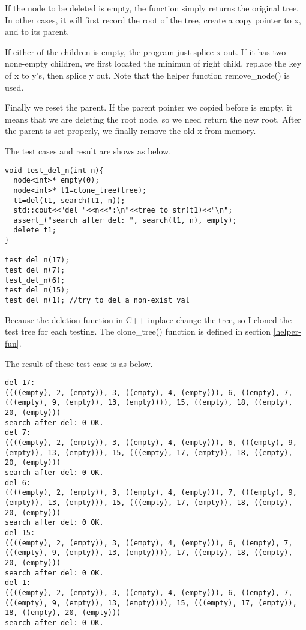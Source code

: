 \documentclass{article}
\begin{document}
If the node to be deleted is empty, the function simply returns the original tree.
In other cases, it will first record the root of the tree, create a copy pointer
to x, and to its parent.

If either of the children is empty, the program just splice x out. If it has two
none-empty children, we first located the minimun of right child, replace the key
of x to y's, then splice y out. Note that the helper function remove\_node() is
used.

Finally we reset the parent. If the parent pointer we copied before is empty, it
means that we are deleting the root node, so we need return the new root. After
the parent is set properly, we finally remove the old x from memory.

The test cases and result are shows as below.

\begin{lstlisting}
void test_del_n(int n){
  node<int>* empty(0);
  node<int>* t1=clone_tree(tree);
  t1=del(t1, search(t1, n));
  std::cout<<"del "<<n<<":\n"<<tree_to_str(t1)<<"\n";
  assert_("search after del: ", search(t1, n), empty);
  delete t1;
}

test_del_n(17);
test_del_n(7);
test_del_n(6);
test_del_n(15);
test_del_n(1); //try to del a non-exist val
\end{lstlisting}

Because the deletion function in C++ inplace change the tree, so I cloned the test 
tree for each testing. The clone\_tree() function is defined in section \ref{helper-fun}.

The result of these test case is as below.
\begin{verbatim}
del 17:
((((empty), 2, (empty)), 3, ((empty), 4, (empty))), 6, ((empty), 7, 
(((empty), 9, (empty)), 13, (empty)))), 15, ((empty), 18, ((empty), 
20, (empty)))
search after del: 0 OK.
del 7:
((((empty), 2, (empty)), 3, ((empty), 4, (empty))), 6, (((empty), 9, 
(empty)), 13, (empty))), 15, (((empty), 17, (empty)), 18, ((empty), 
20, (empty)))
search after del: 0 OK.
del 6:
((((empty), 2, (empty)), 3, ((empty), 4, (empty))), 7, (((empty), 9, 
(empty)), 13, (empty))), 15, (((empty), 17, (empty)), 18, ((empty), 
20, (empty)))
search after del: 0 OK.
del 15:
((((empty), 2, (empty)), 3, ((empty), 4, (empty))), 6, ((empty), 7, 
(((empty), 9, (empty)), 13, (empty)))), 17, ((empty), 18, ((empty), 
20, (empty)))
search after del: 0 OK.
del 1:
((((empty), 2, (empty)), 3, ((empty), 4, (empty))), 6, ((empty), 7, 
(((empty), 9, (empty)), 13, (empty)))), 15, (((empty), 17, (empty)), 
18, ((empty), 20, (empty)))
search after del: 0 OK.
\end{verbatim}
\end{document}
